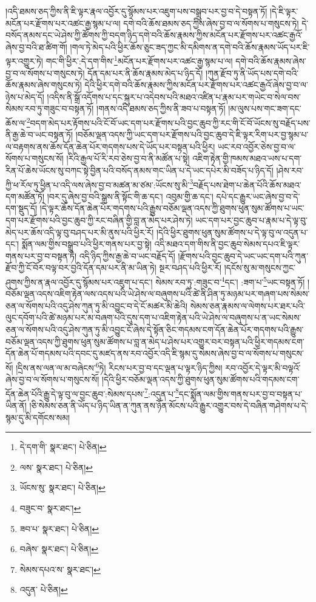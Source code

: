 །འདི་ཐམས་ཅད་ཀྱིས་ནི་ཇི་ལྟར་རྣལ་འབྱོར་དུ་སྙོམས་པར་འཇུག་པས་བསྒྲུབ་པར་བྱ་བ་དེ་བསྟན་ཏོ། །དེ་ཇི་ལྟར་མངོན་པར་རྫོགས་པར་འཚང་རྒྱ་སྙམ་པ་ལ། དགེ་བའི་ཆོས་ཐམས་ཅད་ཀྱིས་ཞེས་བྱ་བ་ལ་སོགས་པ་གསུངས་ཏེ། དེ་བསོད་ནམས་དང་ཡེ་ཤེས་ཀྱི་ཚོགས་ཀྱི་བདག་ཉིད་དགེ་བའི་ཆོས་རྣམས་ཀྱིས་མངོན་པར་རྫོགས་པར་འཚང་རྒྱའོ་ཞེས་བྱ་བའི་ཐ་ཚིག་གོ། །གལ་ཏེ་མེད་པའི་ཕྱིར་ཆོས་ཅུང་ཟད་ཀྱང་མི་དམིགས་ན་དགེ་བའི་ཆོས་རྣམས་ཡོད་པར་ཇི་ལྟར་འགྱུར་ཏེ། གང་གི་ཕྱིར་:དེ་དག་གིས་\footnote{དེ་དག་གི་  སྣར་ཐང་།  པེ་ཅིན། }མངོན་པར་རྫོགས་པར་འཚང་རྒྱ་སྙམ་པ་ལ། དགེ་བའི་ཆོས་རྣམས་ཞེས་བྱ་བ་ལ་སོགས་པ་གསུངས་ཏེ། དོན་དམ་པར་ནི་ཆོས་རྣམས་མེད་པ་ཉིད་དོ། །ཀུན་རྫོབ་ཏུ་ནི་ཡོད་པས་དགེ་བའི་ཆོས་རྣམས་ཞེས་གསུངས་ཏེ། དེའི་ཕྱིར་དགེ་བའི་ཆོས་རྣམས་ཀྱིས་མངོན་པར་རྫོགས་པར་འཚང་རྒྱའོ་ཞེས་བྱ་བ་ལ་ཉེས་པ་མེད་དོ། །འདིས་ནི་སྒྲོ་འདོགས་པ་དང་སྐུར་པ་འདེབས་པའི་མཐའ་འཛིན་པ་རྣམ་པར་གཡེང་བ་སེལ་བས་སེམས་རབ་ཏུ་གཟུང་བ་བསྟན་ཏོ། །གནས་འདི་ཐམས་ཅད་ཀྱིས་ནི་ཟབ་པ་བསྟན་ཏོ། །མ་ལུས་པས་གང་ཟག་དང་ཆོས་ལ་\footnote{ལས་  སྣར་ཐང་།  པེ་ཅིན། }བདག་མེད་པར་རྟོགས་པའི་ངོ་བོ་ཡང་དག་པར་རྫོགས་པའི་བྱང་ཆུབ་ཀྱི་རང་གི་ངོ་བོ་ཡོངས་སུ་བརྗོད་པས་ནི་རྒྱ་ཆེ་བ་ཡང་བསྟན་ཏོ། །བཅོམ་ལྡན་འདས་ཀྱི་ཡང་དག་པར་རྫོགས་པའི་བྱང་ཆུབ་དེ་ཇི་ལྟར་རིག་པར་བྱ་སྙམ་པ་ལ་བརྟགས་ནས་ཆོས་དོན་ཆེན་པོར་གདགས་པས་དེ་ཡོད་པར་བསྟན་པའི་ཕྱིར། ཡང་རབ་འབྱོར་ཅེས་བྱ་བ་ལ་སོགས་པ་གསུངས་སོ། །རིའི་རྒྱལ་པོ་རི་རབ་ཅེས་བྱ་བ་ནི་མཚོན་པ་སྟེ། འཇིག་རྟེན་གྱི་ཁམས་མཐའ་ཡས་པ་དག་རིན་པོ་ཆེས་ཡོངས་སུ་བཀང་སྟེ་བྱིན་པའི་བསོད་ནམས་གང་ཡིན་པ་དེ་ཡང་དཔེར་མི་བཟོད་པ་ཉིད་དོ། །ཤེས་རབ་ཀྱི་ཕ་རོལ་ཏུ་ཕྱིན་པ་འདི་ལས་ཞེས་བྱ་བ་མཚན་མ་ཙམ་:ཡོངས་སུ་མི་\footnote{ཡོངས་སུ་  སྣར་ཐང་།  པེ་ཅིན། }བརྗོད་པས་ཐེག་པ་ཆེན་པོའི་ཆོས་མཐའ་དག་མཚོན་ཏོ། །བར་དུ་ཞེས་བྱ་བའི་སྒྲས་ནི་སྟོང་གི་ཆ་དང་། འབུམ་གྱི་ཆ་དང་། དཔེ་དང་རྒྱུར་ཡང་ཞེས་བྱ་བ་དེ་དག་སྡུད་དོ། །དེ་ལྟར་ཆོས་དོན་ཆེན་པོར་གདགས་པའི་རྒྱུས་བཅོམ་ལྡན་འདས་ཀྱི་ཐུགས་ཕུན་སུམ་ཚོགས་པ་ཡང་དག་པར་རྫོགས་པའི་བྱང་ཆུབ་ཀྱི་རང་བཞིན་གྱི་བླ་ན་མེད་པར་ཤེས་ཏེ། ཡང་དག་པར་བྱང་ཆུབ་པ་རྣམ་པ་དེ་ལྟ་བུ་མེད་པར་ཆོས་འདི་ལྟ་བུ་བཤད་པར་མི་ནུས་པའི་ཕྱིར་རོ། །དེའི་ཕྱིར་ཐུགས་ཕུན་སུམ་ཚོགས་པ་དེ་ལྟ་བུ་ལ་འདུན་པ་དང་། སྨོན་ལམ་གྱིས་བསྒྲུབ་པའི་ཕྱིར་གནས་པར་བྱ་སྟེ། འདི་མཐའ་དག་གིས་ནི་བྱང་ཆུབ་སེམས་དཔའ་ཇི་ལྟར་གནས་པར་བྱ་བ་བསྟན་ཏེ། འདི་ཉིད་ཀྱིས་རྒྱ་ཆེ་བ་ཡང་བརྗོད་དོ། །རྫོགས་པའི་བྱང་ཆུབ་དེ་ཡང་ཡང་དག་པའི་ཀུན་རྫོབ་ཀྱི་ངོ་བོར་བལྟ་བར་བྱའི་དོན་དམ་པར་ནི་མ་ཡིན་ཏེ། སྔར་བཤད་པའི་ཕྱིར་རོ། །དངོས་སུ་མ་གསུངས་ཀྱང་ཤུགས་ཀྱིས་ན་རྣལ་འབྱོར་དུ་སྙོམས་པར་འཇུག་པ་དང་། སེམས་རབ་ཏུ་:གཟུང་བ་\footnote{བཟུང་བ་  སྣར་ཐང་། }དང་། :ཟག་པ་\footnote{ཟབ་པ་  སྣར་ཐང་།  པེ་ཅིན། }ཡང་བསྟན་ཏོ། །བཅོམ་ལྡན་འདས་འཇིག་རྟེན་ལས་འདས་པའི་ཡེ་ཤེས་ལ་བཞུགས་པའི་ཚེ་ནི་ཤིན་ཏུ་མཉམ་པར་གཞག་པས་སེམས་ཅན་ལ་སོགས་པའི་འདུ་ཤེས་ཀུན་ཏུ་མི་འབྱུང་བ་དེ་ངོ་མཚར་མི་ཆེའི། སེམས་ཅན་རྣམས་ལ་ལེགས་པར་ཐར་པའི་ལུང་དབོག་པའི་ཚེ་མཉམ་པར་མ་བཞག་པའི་དུས་དག་པ་འཇིག་རྟེན་པའི་ཡེ་ཤེས་ལ་བཞུགས་པ་ན་ཡང་སེམས་ཅན་ལ་སོགས་པའི་འདུ་ཤེས་ཀུན་ཏུ་མི་འབྱུང་ངོ་ཞེས་དེ་སྟོན་ཅིང་གདམས་ངག་དོན་ཆེན་པོར་གདགས་པའི་རྒྱུས་བཅོམ་ལྡན་འདས་ཀྱི་ཐུགས་ཕུན་སུམ་ཚོགས་པ་བླ་ན་མེད་པ་ཤེས་པར་འགྱུར་བར་བསྟན་པའི་ཕྱིར་གདམས་ངག་དོན་ཆེན་པོ་གདམས་པའི་དབང་དུ་མཛད་ནས་རབ་འབྱོར་འདི་ཇི་སྙམ་དུ་སེམས་ཞེས་བྱ་བ་ལ་སོགས་པ་གསུངས་སོ། །དྲིས་ནས་ལན་ལ་མ་བཞེངས་\footnote{བཞེས་  སྣར་ཐང་།  པེ་ཅིན། }ཏེ། རིངས་པར་བྱ་བ་དང་ལྡན་པ་ལྟར་ཉིད་ཀྱིས། རབ་འབྱོར་དེ་ལྟར་མི་བལྟའོ་ཞེས་བྱ་བ་ལ་སོགས་པ་གསུངས་སོ། །དེའི་ཕྱིར་བཅོམ་ལྡན་འདས་ཀྱི་ཐུགས་ཕུན་སུམ་ཚོགས་པའི་གདམས་ངག་དོན་ཆེན་པོའི་རྒྱུ་དེ་ལྟ་བུ་ལ་བྱང་ཆུབ་:སེམས་དཔས་\footnote{སེམས་དཔའ་ས་  སྣར་ཐང་། }:འདུན་པ་\footnote{འདུན་  པེ་ཅིན། }དང་སྨོན་ལམ་གྱིས་གནས་པར་བྱ་བ་བསྟན་པ་ཡིན་ནོ། །ཅི་སེམས་ཅན་ནི་ཡོད་པ་ཉིད་ཡིན་ན་ཀུན་ནས་ཉོན་མོངས་པའི་རྒྱུར་འགྱུར་བས་དེ་བཞིན་གཤེགས་པ་དེ་སྙམ་དུ་མི་དགོངས་སམ། 